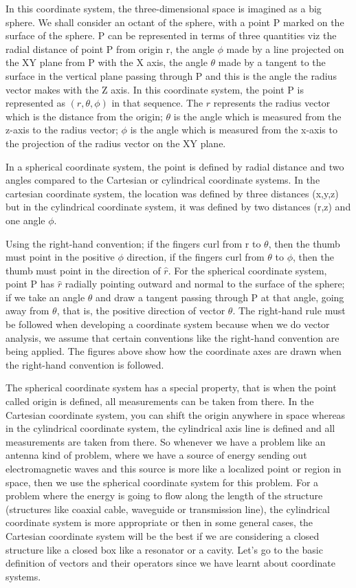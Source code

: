 In this coordinate system, the three-dimensional space is imagined as a big sphere. We shall consider an octant of the sphere, with a point P marked on the surface of the sphere. P can be represented in terms of three quantities viz the radial distance of point P from origin r, the angle $\phi$ made by a line projected on the XY plane from P with the X axis, the angle $\theta$ made by a tangent to the surface in the vertical plane passing through P and this is the angle the radius vector makes with the Z axis. In this coordinate system, the point P is represented as $(r,\theta, \phi)$ in that sequence. The $r$ represents the radius vector which is the distance from the origin; $\theta$ is the angle which is measured from the z-axis to the radius vector; $\phi$ is the angle which is measured from the x-axis to the projection of the radius vector on the XY plane.

In a spherical coordinate system, the point is defined by radial distance and two angles compared to the Cartesian or cylindrical coordinate systems. In the cartesian coordinate system, the location was defined by three distances (x,y,z) but in the cylindrical coordinate system, it was defined by two distances (r,z) and one angle $\phi$.

Using the right-hand convention; if the fingers curl from r to $\theta$, then the thumb must point in the positive $\phi$ direction, if the fingers curl from $\theta$ to $\phi$, then the thumb must point in the direction of $\hat{r}$. For the spherical coordinate system, point P has $\hat{r}$ radially pointing outward and normal to the surface of the sphere; if we take an angle $\theta$ and draw a tangent passing through P at that angle, going away from $\theta$, that is, the positive direction of vector $\theta$. The right-hand rule must be followed when developing a coordinate system because when we do vector analysis, we assume that certain conventions like the right-hand convention are being applied. The figures above show how the coordinate axes are drawn when the right-hand convention is followed.

The spherical coordinate system has a special property, that is when the point called origin is defined, all measurements can be taken from there. In the Cartesian coordinate system, you can shift the origin anywhere in space whereas in the cylindrical coordinate system, the cylindrical axis line is defined and all measurements are taken from there. So whenever we have a problem like an antenna kind of problem, where we have a source of energy sending out electromagnetic waves and this source is more like a localized point or region in space, then we use the spherical coordinate system for this problem. For a problem where the energy is going to flow along the length of the structure (structures like coaxial cable, waveguide or transmission line), the cylindrical coordinate system is more appropriate or then in some general cases, the Cartesian coordinate system will be the best if we are considering a closed structure like a closed box like a resonator or a cavity. Let's go to the basic definition of vectors and their operators since we have learnt about coordinate systems. 

